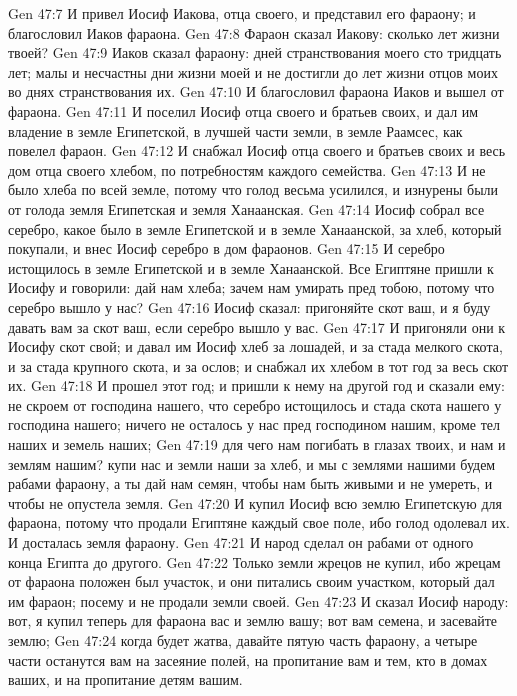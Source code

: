 Gen 47:7  И привел Иосиф Иакова, отца своего, и представил его фараону; и благословил Иаков фараона.
Gen 47:8  Фараон сказал Иакову: сколько лет жизни твоей?
Gen 47:9  Иаков сказал фараону: дней странствования моего сто тридцать лет; малы и несчастны дни жизни моей и не достигли до лет жизни отцов моих во днях странствования их.
Gen 47:10  И благословил фараона Иаков и вышел от фараона.
Gen 47:11  И поселил Иосиф отца своего и братьев своих, и дал им владение в земле Египетской, в лучшей части земли, в земле Раамсес, как повелел фараон.
Gen 47:12  И снабжал Иосиф отца своего и братьев своих и весь дом отца своего хлебом, по потребностям каждого семейства.
Gen 47:13  И не было хлеба по всей земле, потому что голод весьма усилился, и изнурены были от голода земля Египетская и земля Ханаанская.
Gen 47:14  Иосиф собрал все серебро, какое было в земле Египетской и в земле Ханаанской, за хлеб, который покупали, и внес Иосиф серебро в дом фараонов.
Gen 47:15  И серебро истощилось в земле Египетской и в земле Ханаанской. Все Египтяне пришли к Иосифу и говорили: дай нам хлеба; зачем нам умирать пред тобою, потому что серебро вышло у нас?
Gen 47:16  Иосиф сказал: пригоняйте скот ваш, и я буду давать вам за скот ваш, если серебро вышло у вас.
Gen 47:17  И пригоняли они к Иосифу скот свой; и давал им Иосиф хлеб за лошадей, и за стада мелкого скота, и за стада крупного скота, и за ослов; и снабжал их хлебом в тот год за весь скот их.
Gen 47:18  И прошел этот год; и пришли к нему на другой год и сказали ему: не скроем от господина нашего, что серебро истощилось и стада скота нашего у господина нашего; ничего не осталось у нас пред господином нашим, кроме тел наших и земель наших;
Gen 47:19  для чего нам погибать в глазах твоих, и нам и землям нашим? купи нас и земли наши за хлеб, и мы с землями нашими будем рабами фараону, а ты дай нам семян, чтобы нам быть живыми и не умереть, и чтобы не опустела земля.
Gen 47:20  И купил Иосиф всю землю Египетскую для фараона, потому что продали Египтяне каждый свое поле, ибо голод одолевал их. И досталась земля фараону.
Gen 47:21  И народ сделал он рабами от одного конца Египта до другого.
Gen 47:22  Только земли жрецов не купил, ибо жрецам от фараона положен был участок, и они питались своим участком, который дал им фараон; посему и не продали земли своей.
Gen 47:23  И сказал Иосиф народу: вот, я купил теперь для фараона вас и землю вашу; вот вам семена, и засевайте землю;
Gen 47:24  когда будет жатва, давайте пятую часть фараону, а четыре части останутся вам на засеяние полей, на пропитание вам и тем, кто в домах ваших, и на пропитание детям вашим.
